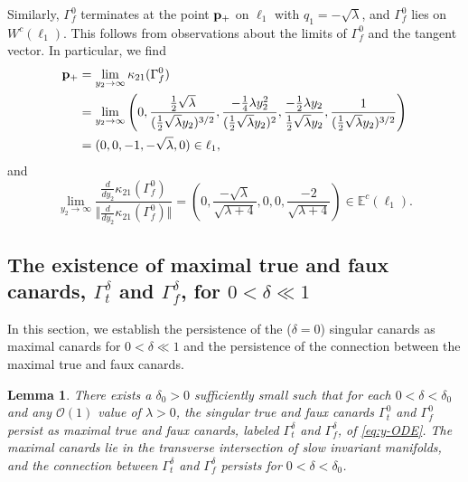 \documentclass[11pt]{article}
\numberwithin{equation}{section}
\newtheorem{lemma}{Lemma}[section]
\begin{document}
Similarly, $\Gamma_f^0$ terminates at the point ${\bf p}_+$ on $\ell_1$ with $q_1=-\sqrt{\lambda}$, and $\Gamma^0_f$ lies on $W^{c}(\ell_1)$.
This follows from observations about the limits of $\Gamma_f^0$ and the tangent vector.
In particular, we find
\begin{equation}\label{eq:limitKappa21-Gammaf}
\begin{split} 
    {\bf p}_+ &= \lim_{y_2 \to \infty} \kappa_{21}(\Gamma_f^0) \\
    &= \lim_{y_2 \to \infty} \left(
    0, \frac{\frac{1}{2}\sqrt{\lambda}}{(\frac{1}{2}\sqrt{\lambda} y_2)^{3/2}},
    \frac{-\frac{1}{4}\lambda y_2^2}{(\frac{1}{2}\sqrt{\lambda} y_2)^2},
    \frac{-\frac{1}{2}\lambda y_2}{\frac{1}{2}\sqrt{\lambda} y_2},
    \frac{1}{(\frac{1}{2}\sqrt{\lambda} y_2)^{3/2}}
    \right) \\
    &=(0,0,-1,-\sqrt{\lambda},0) \in \ell_1, 
    \end{split} 
\end{equation}
and 
\begin{equation*}
    \lim_{y_2 \to \infty} 
    \frac{ \frac{d}{dy_2} \kappa_{21}(\Gamma_f^0)}
    { \Vert \frac{d}{dy_2} \kappa_{21}(\Gamma_f^0) \Vert}
       =\left(0,\frac{-\sqrt{\lambda}}{\sqrt{\lambda + 4}},0,0,\frac{-2}{\sqrt{\lambda+4}}\right) \in \mathbb{E}^c(\ell_1). 
\end{equation*}


\subsection{The existence of maximal true and faux canards, 
\texorpdfstring{$\Gamma^\delta_t$ and $\Gamma^\delta_f$, for $0< \delta \ll 1$}{Lg}}
\label{sec:persistence-RFS}

In this section, we establish the persistence of the ($\delta=0$) singular canards as maximal canards for $0<\delta \ll 1$ and the persistence of the connection between the maximal true and faux canards.

\medskip

\begin{lemma} \label{lem-persistence-true+fauxcanards-RFS}
There exists a $\delta_0>0$ sufficiently small such that for each $0<\delta<\delta_0$ and any $\mathcal{O}(1)$ value of $\lambda>0$,
the singular true and faux canards $\Gamma_t^0$ and $\Gamma_f^0$ persist as maximal true and faux canards, labeled $\Gamma_t^\delta$ and $\Gamma_f^\delta$, of \eqref{eq:y-ODE}.
The maximal canards lie in the transverse intersection of slow invariant manifolds,
and the connection between $\Gamma_t^\delta$ and $\Gamma_f^\delta$ persists for $0 < \delta< \delta_0$.
\end{lemma}
\end{document}
